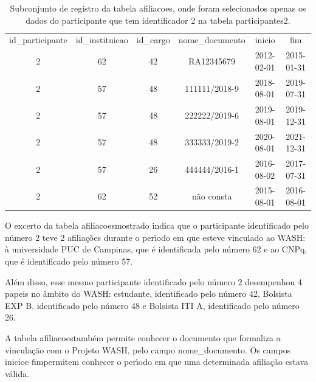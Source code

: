 \documentclass[
12pt,		%
openright,	%
twoside,  %
a4paper,			%
chapter=TITLE,		%
english,			%
french,				%
spanish,			%
brazil				%
]{USPSC-classe/USPSC}
\begin{document}
\begin{table}[htb]
\tiny
\caption{\label{e6120545268b93238330297571c4756e7c97df1a}Subconjunto de registro da tabela afiliacoes, onde foram selecionados apenas os dados do participante que tem identificador 2 na tabela participantes2.}

\centering
\begin{tabular}{|c|c|c|c|c|c|}
\hline
id\_participante  &  id\_instituicao  &  id\_cargo  &  nome\_documento  &  inicio      &  fim \\
              2  &              62  &        42  &  RA12345679      &  2012-02-01  &  2015-01-31  \\
              2  &              57  &        48  &  111111/2018-9   &  2018-08-01  &  2019-07-31  \\
              2  &              57  &        48  &  222222/2019-6   &  2019-08-01  &  2019-12-31  \\
              2  &              57  &        48  &  333333/2019-2   &  2020-08-01  &  2021-12-31  \\
              2  &              57  &        26  &  444444/2016-1   &  2016-08-02  &  2017-07-31  \\
              2  &              62  &        52  &  n\~ao consta      &  2015-08-01  &  2016-08-01 \\
\hline
\end{tabular}
\end{table}


O excerto da tabela \textquotedbl afiliacoes\textquotedbl  mostrado indica que o participante identificado pelo n\'umero 2 teve 2 afilia\c{c}\~oes durante o per\'{\i}odo em que esteve vinculado ao WASH: \`a universidade PUC de Campinas, que \'e identificada pelo n\'umero 62 e ao CNPq, que \'e identificado pelo n\'umero 57.










Al\'em disso, esse mesmo participante identificado pelo n\'umero 2 desempenhou 4 papeis no \^ambito do WASH: estudante, identificado pelo n\'umero 42, Bolsista EXP B, identificado pelo n\'umero 48 e Bolsista ITI A, identificado pelo n\'umero 26.










A tabela \textquotedbl afiliacoes\textquotedbl  tamb\'em permite conhecer o documento que formaliza a vincula\c{c}\~ao com o Projeto WASH, pelo campo nome\_documento. Os campos \textquotedbl inicio\textquotedbl  e \textquotedbl fim\textquotedbl  permitem conhecer o per\'{\i}odo em que uma determinada afilia\c{c}\~ao estava v\'alida.
\end{document}
